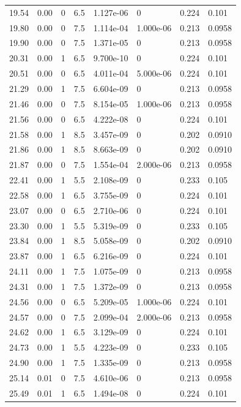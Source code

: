 \documentclass[preview]{standalone}
\begin{document}
{{{\begin{tabular}{L{1.2cm}C{1.2cm} C{0.3cm}C{0.5cm} C{1.4cm}C{1.4cm} C{1.4cm}C{1.4cm}}
  19.54  &  0.00  & 0     & 6.5 &  1.127e-06  & 0  & 0.224 &  0.101   \\ 
  19.80  &  0.00  & 0     & 7.5 &  1.114e-04  & 1.000e-06  & 0.213 &  0.0958   \\ 
  19.90  &  0.00  & 0     & 7.5 &  1.371e-05  & 0  & 0.213 &  0.0958   \\ 
  20.31  &  0.00  & 1     & 6.5 &  9.700e-10  & 0  & 0.224 &  0.101   \\ 
  20.51  &  0.00  & 0     & 6.5 &  4.011e-04  & 5.000e-06  & 0.224 &  0.101   \\ 
  21.29  &  0.00  & 1     & 7.5 &  6.604e-09  & 0  & 0.213 &  0.0958   \\ 
  21.46  &  0.00  & 0     & 7.5 &  8.154e-05  & 1.000e-06  & 0.213 &  0.0958   \\ 
  21.56  &  0.00  & 0     & 6.5 &  4.222e-08  & 0  & 0.224 &  0.101   \\ 
  21.58  &  0.00  & 1     & 8.5 &  3.457e-09  & 0  & 0.202 &  0.0910   \\ 
  21.86  &  0.00  & 1     & 8.5 &  8.663e-09  & 0  & 0.202 &  0.0910   \\ 
  21.87  &  0.00  & 0     & 7.5 &  1.554e-04  & 2.000e-06  & 0.213 &  0.0958   \\ 
  22.41  &  0.00  & 1     & 5.5 &  2.108e-09  & 0  & 0.233 &  0.105   \\ 
  22.58  &  0.00  & 1     & 6.5 &  3.755e-09  & 0  & 0.224 &  0.101   \\ 
  23.07  &  0.00  & 0     & 6.5 &  2.710e-06  & 0  & 0.224 &  0.101   \\ 
  23.30  &  0.00  & 1     & 5.5 &  5.319e-09  & 0  & 0.233 &  0.105   \\ 
  23.84  &  0.00  & 1     & 8.5 &  5.058e-09  & 0  & 0.202 &  0.0910   \\ 
  23.87  &  0.00  & 1     & 6.5 &  6.216e-09  & 0  & 0.224 &  0.101   \\ 
  24.11  &  0.00  & 1     & 7.5 &  1.075e-09  & 0  & 0.213 &  0.0958   \\ 
  24.31  &  0.00  & 1     & 7.5 &  1.372e-09  & 0  & 0.213 &  0.0958   \\ 
  24.56  &  0.00  & 0     & 6.5 &  5.209e-05  & 1.000e-06  & 0.224 &  0.101   \\ 
  24.57  &  0.00  & 0     & 7.5 &  2.099e-04  & 2.000e-06  & 0.213 &  0.0958   \\ 
  24.62  &  0.00  & 1     & 6.5 &  3.129e-09  & 0  & 0.224 &  0.101   \\ 
  24.73  &  0.00  & 1     & 5.5 &  4.223e-09  & 0  & 0.233 &  0.105   \\ 
  24.90  &  0.00  & 1     & 7.5 &  1.335e-09  & 0  & 0.213 &  0.0958   \\ 
  25.14  &  0.01  & 0     & 7.5 &  4.610e-06  & 0  & 0.213 &  0.0958   \\ 
  25.49  &  0.01  & 1     & 6.5 &  1.494e-08  & 0  & 0.224 &  0.101   \\ 
\hline 
\end{tabular} 

}}}
\end{document}
